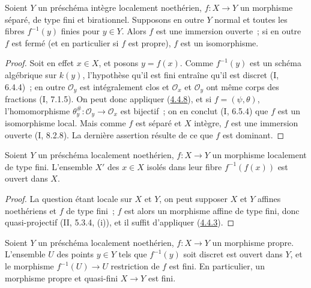\begin{corollary}[4.4.9]
\label{III.4.4.9-fr}
Soient $Y$ un préschéma intègre localement noethérien, $f:X\to Y$ un
morphisme séparé, de type fini et birationnel. Supposons en outre $Y$ normal
et toutes les fibres $f^{-1}(y)$ finies pour $y\in Y$. Alors $f$ est une
immersion ouverte~; si en outre $f$ est fermé (et en particulier si $f$ est
propre), $f$ est un isomorphisme.
\end{corollary}

\begin{proof}
Soit en effet $x\in X$, et posons $y=f(x)$. Comme $f^{-1}(y)$ est un schéma
algébrique sur $k(y)$, l'hypothèse qu'il est fini entraîne qu'il est discret
(I, 6.4.4)~; en outre $\mathcal O_y$ est intégralement clos et
$\mathcal O_x$ et $\mathcal O_y$ ont même corps des fractions (I, 7.1.5).
On peut donc appliquer (\hyperref[III.4.4.8-fr]{4.4.8}), et si
$f=(\psi,\theta)$, l'homomorphisme
$\theta_y^\#:\mathcal O_y\to\mathcal O_x$ est bijectif~; on en conclut
(I, 6.5.4) que $f$ est un isomorphisme local. Mais comme $f$ est séparé et
$X$ intègre, $f$ est une immersion ouverte (I, 8.2.8). La dernière assertion
résulte de ce que $f$ est dominant.
\end{proof}

\begin{proposition}[4.4.10]
\label{III.4.4.10-fr}
Soient $Y$ un préschéma localement noethérien, $f:X\to Y$ un morphisme
localement de type fini. L'ensemble $X'$ des $x\in X$ isolés dans leur fibre
$f^{-1}(f(x))$ est ouvert dans $X$.
\end{proposition}

\begin{proof}
La question étant locale sur $X$ et $Y$, on peut supposer $X$ et $Y$ affines
noethériens et $f$ de type fini~; $f$ est alors un morphisme affine de type
fini, donc quasi-projectif (II, 5.3.4, (i)), et il suffit d'appliquer
(\hyperref[III.4.4.3-fr]{4.4.3}).
\end{proof}


\begin{corollary}[4.4.11]
\label{III.4.4.11-fr}
Soient $Y$ un préschéma localement noethérien, $f:X\to Y$ un morphisme
propre. L'ensemble $U$ des points $y\in Y$ tels que $f^{-1}(y)$ soit discret
est ouvert dans $Y$, et le morphisme $f^{-1}(U)\to U$ restriction de $f$ est
fini. En particulier, un morphisme propre et quasi-fini $X\to Y$ est fini.
\end{corollary}


